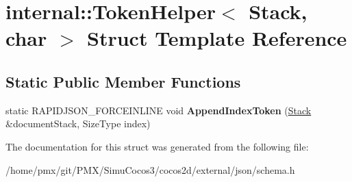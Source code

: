 \hypertarget{structinternal_1_1TokenHelper_3_01Stack_00_01char_01_4}{}\section{internal\+:\+:Token\+Helper$<$ Stack, char $>$ Struct Template Reference}
\label{structinternal_1_1TokenHelper_3_01Stack_00_01char_01_4}
\subsection*{Static Public Member Functions}
\begin{DoxyCompactItemize}
\item 
\mbox{\label{structinternal_1_1TokenHelper_3_01Stack_00_01char_01_4_a5d635eb7590e098c3340c9e5dcc72ae3}} 
static R\+A\+P\+I\+D\+J\+S\+O\+N\+\_\+\+F\+O\+R\+C\+E\+I\+N\+L\+I\+NE void {\bfseries Append\+Index\+Token} (\hyperlink{classinternal_1_1Stack}{Stack} \&document\+Stack, Size\+Type index)
\end{DoxyCompactItemize}


The documentation for this struct was generated from the following file\+:\begin{DoxyCompactItemize}
\item 
/home/pmx/git/\+P\+M\+X/\+Simu\+Cocos3/cocos2d/external/json/schema.\+h\end{DoxyCompactItemize}
